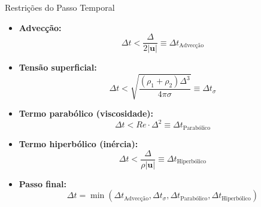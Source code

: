 \documentclass[../main/main.tex]{subfiles}
\begin{document}
\begin{frame}{Restrições do Passo Temporal}
  \begin{itemize}
    \item \textbf{Advecção:}
      \[
        \Delta t < \frac{\Delta}{2|\mathbf{u}|} \equiv \Delta t_{\text{Advecção}}
      \]
    \item \textbf{Tensão superficial:}
      \[
        \Delta t < \sqrt{\frac{(\rho_1 + \rho_2)\Delta^3}{4\pi\sigma}} \equiv \Delta t_{\sigma}
      \]
    \item \textbf{Termo parabólico (viscosidade):}
      \[
        \Delta t < Re \cdot \Delta^2 \equiv \Delta t_{\text{Parabólico}}
      \]
    \item \textbf{Termo hiperbólico (inércia):}
      \[
        \Delta t < \frac{\Delta}{\rho |\mathbf{u}|} \equiv \Delta t_{\text{Hiperbólico}}
      \]
    \item \textbf{Passo final:}
      \[
        \Delta t = \min(\Delta t_{\text{Advecção}}, \Delta t_{\sigma}, \Delta t_{\text{Parabólico}}, \Delta t_{\text{Hiperbólico}})
      \]
  \end{itemize}
\end{frame}
\end{document}

